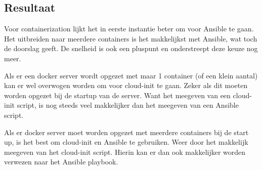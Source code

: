 \subsection{Resultaat}
Voor containerization lijkt het in eerste instantie beter om voor Ansible te gaan. Het uitbreiden naar meerdere containers is het makkelijkst met Ansible, wat toch de doorslag geeft. De snelheid is ook een pluspunt en onderstreept deze keuze nog meer.

Als er een docker server wordt opgezet met maar 1 container (of een klein aantal) kan er wel overwogen worden om voor cloud-init te gaan. Zeker als dit moeten worden opgezet bij de startup van de server. Want het meegeven van een cloud-init script, is nog steeds veel makkelijker dan het meegeven van een Ansible script. 

Als er docker server moet worden opgezet met meerdere containers bij de start up, is het best om cloud-init en Ansible te gebruiken. Weer door het makkelijk meegeven van het cloud-init script. Hierin kan er dan ook makkelijker worden verwezen naar het Ansible playbook.
